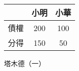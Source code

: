 \begin{center}
	\hfill
	\begin{tabular}{r|cc}
		\toprule
		& 小明 & 小華 \\
		\hline
		債權 & 200 & 100 \\
		分得 & 150 & 50 \\
		\bottomrule
	\end{tabular}
	\hfill\textsf{\small{塔木德（一）}}
\end{center}
